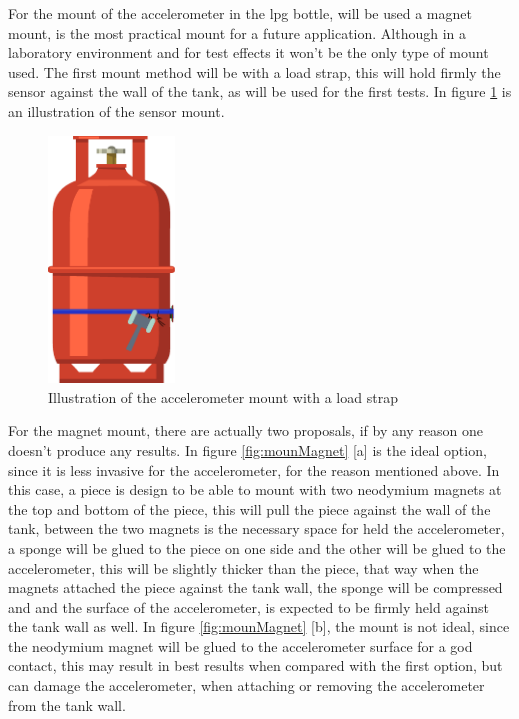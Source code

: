 For the mount of the accelerometer in the \acrshort{lpg} bottle, will be used a magnet mount, is the most practical mount for a future application. Although in a laboratory environment and for test effects it won't be the only type of mount used. The first mount method will be with a load strap, this will hold firmly the sensor against the wall of the tank, as will be used for the first tests. In figure \ref{fig:mounLoadStrap} is an illustration of the sensor mount.
\begin{figure}[]
    \centering
    \includegraphics[width=0.3\textwidth]{Chapters/4CHP/Figures/AccLoadStrap.eps}
    \caption{Illustration of the accelerometer mount with a load strap}
    \label{fig:mounLoadStrap}
\end{figure}
For the magnet mount, there are actually two proposals, if by any reason one doesn't produce any results. In figure \ref{fig:mounMagnet} [a] is the ideal option, since it is less invasive for the accelerometer, for the reason mentioned above. In this case, a piece is design to be able to mount with two neodymium magnets at the top and bottom of the piece, this will pull the piece against the wall of the tank, between the two magnets is the necessary space for held the accelerometer, a sponge will be glued to the piece on one side and the other will be glued to the accelerometer, this will be slightly thicker than the piece, that way when the magnets attached the piece against the tank wall, the sponge will be compressed and and the surface of the accelerometer, is expected to be firmly held against the tank wall as well. In figure \ref{fig:mounMagnet} [b], the mount is not ideal, since the neodymium magnet will be glued to the accelerometer surface for a god contact, this may result in best results when compared with the first option, but can damage the accelerometer, when attaching or removing the accelerometer from the tank wall.
